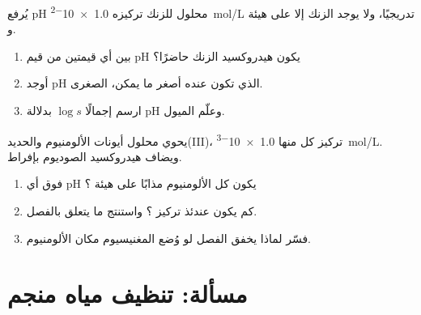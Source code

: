 \begin{exercise}[$\star\star\star$]\label{exo:b1:precipitation:11}
يُرفع pH محلول للزنك تركيزه \qty{1.0e-2}{mol/L} تدريجيًا،
ولا يوجد الزنك إلا على هيئة  و.
\begin{enumerate}
  \item بين أي قيمتين من قيم pH يكون هيدروكسيد الزنك حاضرًا؟
  \item أوجد pH الذي تكون عنده  أصغر ما يمكن،  الصغرى.
  \item ارسم إجمالًا $\log s$ بدلالة pH وعلّم الميول.
\end{enumerate}
\end{exercise}

\begin{exercise}[$\star\star\star$]\label{exo:b1:precipitation:12}
يحوي محلول أيونات الألومنيوم والحديد(III)، تركيز كل منها
\qty{1.0e-3}{mol/L}. ويضاف هيدروكسيد الصوديوم بإفراط.
\begin{enumerate}
  \item فوق أي pH يكون كل الألومنيوم مذابًا على هيئة ؟
  \item كم يكون عندئذ تركيز ؟ واستنتج ما يتعلق
        بالفصل.
  \item فسّر لماذا يخفق الفصل لو وُضع المغنيسيوم مكان
        الألومنيوم.
\end{enumerate}
\end{exercise}

\section{مسألة: تنظيف مياه منجم}

